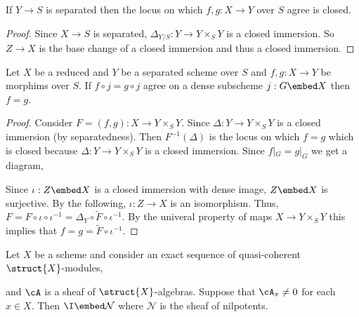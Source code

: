 \documentclass[12pt]{article}
\begin{document}
\begin{lemma}
If $Y \to S$ is separated then the locus on which $f,g : X \to Y$ over $S$ agree is closed.
\end{lemma}

\begin{proof}
Since $X \to S$ is separated, $\Delta_{Y/S} : Y \to Y \times_S Y$ is a closed immersion. So $Z \to X$ is the base change of a closed immersion and thus a closed immersion. 
\end{proof}

\begin{lemma}
Let $X$ be a reduced and $Y$ be a separated scheme over $S$ and $f ,g : X \to Y$ be morphims over $S$. If $f \circ j = g \circ j$ agree on a dense subscheme $j : G \embed X$ then $f = g$.
\end{lemma}

\begin{proof}
Consider $F = (f, g) : X \to Y \times_S Y$. Since $\Delta : Y \to Y \times_S Y$ is a closed immersion (by separatedness). Then $F^{-1}(\Delta)$ is the locus on which $f = g$ which is closed because $\Delta : Y \to Y \times_S Y$ is a closed immersion. Since $f|_G = g|_G$ we get a diagram,
\begin{center}
\end{center}
Since $\iota : Z \embed X$ is a closed immersion with dense image, $Z \embed X$ is surjective. By the following, $\iota : Z \to X$ is an isomorphism. Thus, $F = F \circ \iota \circ \iota^{-1} = \Delta_Y \circ \tilde{F} \circ \iota^{-1}$. By the univeral property of maps $X \to Y \times_S Y$ this implies that $f = g = \tilde{F} \circ \iota^{-1}$.
\end{proof}

\newcommand{\Nil}{\mathcal{N}}

\begin{lemma}
Let $X$ be a scheme and consider an exact sequence of quasi-coherent $\struct{X}$-modules,
\begin{center}
\end{center}
and $\cA$ is a sheaf of $\struct{X}$-algebras. 
Suppose that $\cA_x \neq 0$ for each $x \in X$. Then $\I \embed \Nil$ where $\Nil$ is the sheaf of nilpotents.
\end{lemma}
\end{document}
